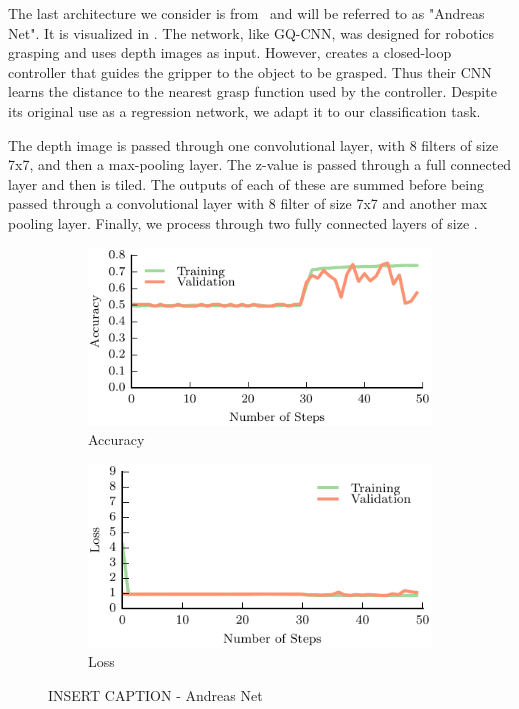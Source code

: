 The last architecture we consider is from~\cite{viereck2017learning} and will be referred to as "Andreas Net". 
It is visualized in . 
The network, like GQ-CNN, was designed for robotics grasping and uses depth images as input. 
However, \cite{viereck2017learning} creates a closed-loop controller that guides the gripper to the object to be grasped. 
Thus their CNN learns the distance to the nearest grasp function used by the controller. 
Despite its original use as a regression network, we adapt it to our classification task. 

The depth image is passed through one convolutional layer, with 8 filters of size 7x7, and then a max-pooling layer. 
The z-value is passed through a full connected layer and then is tiled.
 
The outputs of each of these are summed before being passed through a convolutional layer with 8 filter of size 7x7 and another max pooling layer. 
Finally, we process through two fully connected layers of size . 


\begin{figure}[t!]
    \centering
    \begin{subfigure}[t]{0.49\textwidth}
        \includegraphics[width=0.9\columnwidth]{figs/andreas_accuracy.pdf}
        \caption{Accuracy} \label{fig:accuracy}
        \end{subfigure}
    \begin{subfigure}[t]{0.49\textwidth}
        \includegraphics[width=0.9\columnwidth]{figs/andreas_loss.pdf}
        \caption{Loss} \label{fig:loss}
    \end{subfigure}
\caption{INSERT CAPTION - Andreas Net} \label{fig:andreas_results}
\end{figure}